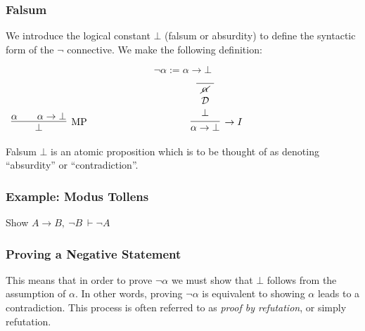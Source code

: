 \documentclass{beamer}
\begin{document}
\begin{frame}
	\frametitle{Falsum}
	
	We introduce the logical constant $\bot$ (falsum or absurdity) to define the syntactic form of the $\lnot$ connective. We make the following definition: 
	
	$$\lnot \alpha:= \alpha \rightarrow \bot$$
	
	\vspace{0.5cm}
	
	\begin{center}
		$\begin{array} { c c c }
		
		\infer[\MP]{\bot}{\alpha \quad & \alpha \rightarrow \bot}
		
		& \hspace{3cm} &
		
		\infer[\rightarrow I]{\alpha \rightarrow \bot}{\begin{array}{c} 
			\hline \cancel{\alpha} \\
			\mathcal{D} \\ 
			\bot			
		\end{array}}		
		
		\end{array}$
	\end{center}
	
	\vspace{1cm}
	
	Falsum $\bot$ is an atomic proposition which is to be thought of as denoting ``absurdity'' or ``contradiction''. 
	
\end{frame}

\begin{frame}
	\frametitle{Example: Modus Tollens}	
	
	Show $A \rightarrow B, \ \lnot B \ \vdash \lnot A$
	
	\vspace{70mm}
	
\end{frame}

\begin{frame}
	\frametitle{Proving a Negative Statement}

	This means that in order to prove $\lnot \alpha$ we must show that $\bot$ follows from the assumption of $\alpha$. In other words, proving $\lnot \alpha$ is equivalent to showing $\alpha$ leads to a contradiction. This process is often referred to as \emph{proof by refutation}, or simply refutation.

	\vspace{50mm}

\end{frame}
\end{document}

